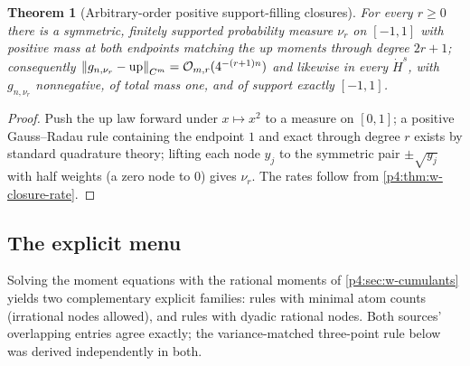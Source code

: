 \documentclass[11pt,oneside]{article}
\numberwithin{equation}{section}
\newtheorem{theorem}{Theorem}[section]
\theoremstyle{definition}
\theoremstyle{remark}
\newcommand{\Up}{\operatorname{up}}
\newcommand{\bigO}{\mathcal O}
\begin{document}
\begin{theorem}[Arbitrary-order positive support-filling closures]
\label{p4:thm:w-existence}
For every $r\ge0$ there is a symmetric, finitely supported probability
measure $\nu_r$ on $[-1,1]$ with positive mass at both endpoints matching
the up moments through degree $2r+1$; consequently
$\norm{g_{n,\nu_r}-\Up}_{C^m}=\bigO_{m,r}(4^{-(r+1)n})$ and likewise in
every $\dot H^s$, with $g_{n,\nu_r}$ nonnegative, of total mass one, and of
support exactly $[-1,1]$.
\end{theorem}

\begin{proof}
Push the up law forward under $x\mapsto x^2$ to a measure on $[0,1]$; a
positive Gauss--Radau rule containing the endpoint $1$ and exact through
degree $r$ exists by standard quadrature theory; lifting each node $y_j$ to
the symmetric pair $\pm\sqrt{y_j}$ with half weights (a zero node to $0$)
gives $\nu_r$.  The rates follow from \cref{p4:thm:w-closure-rate}.
\end{proof}

\subsection{The explicit menu}

Solving the moment equations with the rational moments of
\cref{p4:sec:w-cumulants} yields two complementary explicit families: rules
with minimal atom counts (irrational nodes allowed), and rules with dyadic
rational nodes.  Both sources' overlapping entries agree exactly; the
variance-matched three-point rule below was derived independently in both.
\end{document}
